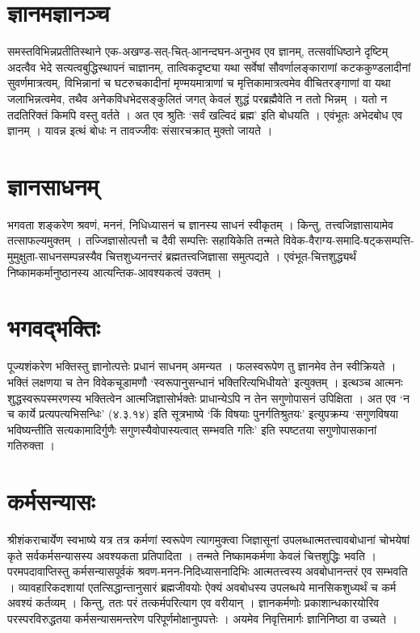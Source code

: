 \section*{ज्ञानमज्ञानञ्च}

समस्तविभिन्नप्रतीतिस्थाने एक-अखण्ड-सत्-चित्-आनन्दघन-अनुभव एव ज्ञानम्, तत्सर्वाधिष्ठाने दृष्टिम् अदत्वैव भेदे सत्यत्वबुद्धिस्थापनं चाज्ञानम्, तात्विकदृष्ट्या यथा सर्वेषां सौवर्णालङ्काराणां कटककुण्डलादीनां सुवर्णमात्रत्वम्, विभिन्नानां च घटरुचकादीनां मृण्मयमात्राणां च मृत्तिकामात्रत्वमेव वीचितरङ्गाणां वा यथा जलाभिन्नत्वमेव, तथैव अनेकविधभेदसङ्कुलितं जगत् केवलं शुद्धं परब्रह्मैवेति न ततो भिन्नम् । यतो न तदतिरिक्तं किमपि वस्तु वर्तते । अत एव श्रुतिः ‘सर्वं खल्विदं ब्रह्म’ इति बोधयति । एवंभूतः अभेदबोध एव ज्ञानम् । यावन्न इत्थं बोधः न तावज्जीवः संसारचक्रात् मुक्तो जायते । 

\section*{ज्ञानसाधनम्}

भगवता शङ्करेण श्रवणं, मननं, निधिध्यासनं च ज्ञानस्य साधनं स्वीकृतम् । किन्तु, तत्त्वजिज्ञासायामेव तत्साफल्यमुक्तम् । तज्जिज्ञासोत्पत्तौ च दैवी सम्पत्तिः सहायिकेति तन्मते विवेक-वैराग्य-समादि-षट्कसम्पत्ति-मुमुक्षुता-साधनसम्पन्नस्यैव चित्तशुध्यनन्तरं ब्रह्मतत्त्वजिज्ञासा समुत्पद्यते । एवंभूत-चित्तशुद्ध्यर्थं निष्कामकर्मानुष्ठानस्य आत्यन्तिक-आवश्यकत्वं उक्तम् ।

\section*{भगवद्भक्तिः}

पूज्यशंकरेण भक्तिस्तु ज्ञानोत्पत्तेः प्रधानं साधनम् अमन्यत । फलस्वरूपेण तु ज्ञानमेव तेन स्वीक्रियते । भक्तिं लक्षणया च तेन विवेकचूडामणौ ‘स्वरूपानुसन्धानं भक्तिरित्यभिधीयते’ इत्युक्तम् । इत्थञ्च आत्मनः शुद्धस्वरूपस्मरणस्य भक्तित्वेन आत्मजिज्ञासोर्भक्तेः प्राधान्येऽपि न तेन सगुणोपासनं उपिक्षिता । अत एव ‘न च कार्ये प्रत्यपत्यभिसन्धिः’ (४.३.१४) इति सूत्रभाष्ये ‘किं विषयाः पुनर्गतिश्रुतयः’ इत्युपक्रम्य ‘सगुणविषया भविष्यन्तीति सत्यकामादिर्गुणैः सगुणस्यैवोपास्यत्वात् सम्भवति गतिः’ इति स्पष्टतया सगुणोपासकानां गतिरुक्ता । 

\section*{कर्मसन्यासः}

श्रीशंकराचार्येण स्वभाष्ये यत्र तत्र कर्मणां स्वरूपेण त्यागमुक्त्वा जिज्ञासूनां उपलब्धात्मतत्त्वावबोधानां चोभयेषां कृते सर्वकर्मसन्यासस्य अवश्यकता प्रतिपादिता । तन्मते निष्कामकर्मणा केवलं चित्तशुद्धिः भवति । परमपदावाप्तिस्तु कर्मसन्यासपूर्वकं श्रवण-मनन-निदिध्यासनादिभिः आत्मतत्त्वस्य अवबोधानन्तरं एव सम्भवति । व्यावहारिकदशायां एतत्सिद्धान्तानुसारं ब्रह्मजीवयोः ऐक्यं अवबोधस्य उपलब्धये मानसिकशुध्यर्थं च कर्म अवश्यं कर्तव्यम् । किन्तु, ततः परं तत्कर्मपरित्याग एव वरीयान् । ज्ञानकर्मणोः प्रकाशान्धकारयोरिव परस्परविरुद्धतया कर्मसन्यासमन्तरेण परिपूर्णमोक्षानुपपत्तेः । अयमेव निवृत्तिमार्गः ज्ञानिनिष्ठा वा उच्यते ।


